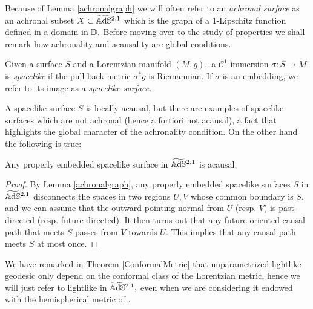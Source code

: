 Because of Lemma \ref{achronalgraph} we will often refer to an \textit{achronal surface} as an achronal subset $X\subset\widetilde{\mathbb{A}\mathrm{d}\mathbb{S}}{}^{2,1}$ which is the graph of a 1-Lipschitz function defined in a domain in $\mathbb{D}.$ Before moving over to the study of properties we shall remark how achronality and acausality are global conditions. 

\begin{definition} Given a surface $S$ and a Lorentzian manifold $(M,g),$ a $\mathcal{C}^1$ immersion $\sigma:S\to M$ is \textit{spacelike} if the pull-back metric $\sigma^*g$ is Riemannian. If $\sigma$ is an embedding, we refer to its image as a \textit{spacelike surface}.
\end{definition}

A spacelike surface $S$ is locally acausal, but there are examples of spacelike surfaces which are not achronal (hence a fortiori not acausal), a fact that highlights the global character of the achronality condition. On the other hand the following is true: 

\begin{lemma}
    Any properly embedded spacelike surface in $\widetilde{\mathbb{A}\mathrm{d}\mathbb{S}}{}^{2,1}$ is acausal. 
\end{lemma}
\begin{proof}
    By Lemma \ref{achronalgraph}, any properly embedded spacelike surfaces $S$ in $\widetilde{\mathbb{A}\mathrm{d}\mathbb{S}}{}^{2,1}$ disconnects the spaces in two regions $U,V$ whose common boundary is $S$, and we can assume that the outward pointing normal from $U$ (resp. $V$) is past-directed (resp. future directed). It then turns out that any future oriented causal path that meets $S$ passes from $V$ towards $U$. This implies that any causal path meets $S$ at most once.
\end{proof}

We have remarked in Theorem \ref{ConformalMetric} that unparametrized lightlike geodesic only depend on the conformal class of the Lorentzian metric, hence we will just refer to lightlike in $\widetilde{\mathbb{A}\mathrm{d}\mathbb{S}}{}^{2,1},$ even when we are considering it endowed with the hemispherical metric of . 


